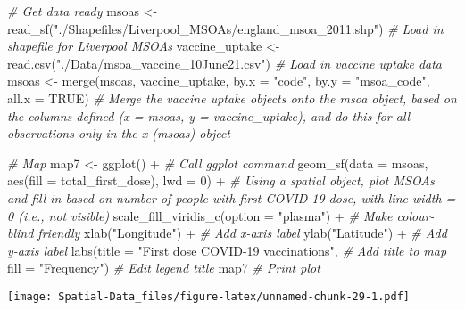 \documentclass[
]{book}
\newenvironment{Shaded}{\begin{snugshade}}{\end{snugshade}}
\newcommand{\AttributeTok}[1]{\textcolor[rgb]{0.77,0.63,0.00}{#1}}
\newcommand{\CommentTok}[1]{\textcolor[rgb]{0.56,0.35,0.01}{\textit{#1}}}
\newcommand{\ConstantTok}[1]{\textcolor[rgb]{0.00,0.00,0.00}{#1}}
\newcommand{\DecValTok}[1]{\textcolor[rgb]{0.00,0.00,0.81}{#1}}
\newcommand{\FunctionTok}[1]{\textcolor[rgb]{0.00,0.00,0.00}{#1}}
\newcommand{\NormalTok}[1]{#1}
\newcommand{\OtherTok}[1]{\textcolor[rgb]{0.56,0.35,0.01}{#1}}
\newcommand{\SpecialCharTok}[1]{\textcolor[rgb]{0.00,0.00,0.00}{#1}}
\newcommand{\StringTok}[1]{\textcolor[rgb]{0.31,0.60,0.02}{#1}}
\begin{document}
\begin{Shaded}
\begin{Highlighting}[]
\CommentTok{\# Get data ready}
\NormalTok{msoas }\OtherTok{\textless{}{-}} \FunctionTok{read\_sf}\NormalTok{(}\StringTok{"./Shapefiles/Liverpool\_MSOAs/england\_msoa\_2011.shp"}\NormalTok{)  }\CommentTok{\# Load in shapefile for Liverpool MSOAs}
\NormalTok{vaccine\_uptake }\OtherTok{\textless{}{-}} \FunctionTok{read.csv}\NormalTok{(}\StringTok{"./Data/msoa\_vaccine\_10June21.csv"}\NormalTok{) }\CommentTok{\# Load in vaccine uptake data}
\NormalTok{msoas }\OtherTok{\textless{}{-}} \FunctionTok{merge}\NormalTok{(msoas, vaccine\_uptake, }\AttributeTok{by.x =} \StringTok{"code"}\NormalTok{, }\AttributeTok{by.y =} \StringTok{"msoa\_code"}\NormalTok{, }\AttributeTok{all.x =} \ConstantTok{TRUE}\NormalTok{) }\CommentTok{\# Merge the vaccine uptake objects onto the msoa object, based on the columns defined (x = msoas, y = vaccine\_uptake), and do this for all observations only in the x (msoas) object}

\CommentTok{\# Map}
\NormalTok{map7 }\OtherTok{\textless{}{-}} \FunctionTok{ggplot}\NormalTok{() }\SpecialCharTok{+} \CommentTok{\# Call ggplot command}
            \FunctionTok{geom\_sf}\NormalTok{(}\AttributeTok{data =}\NormalTok{ msoas, }\FunctionTok{aes}\NormalTok{(}\AttributeTok{fill =}\NormalTok{ total\_first\_dose), }\AttributeTok{lwd =} \DecValTok{0}\NormalTok{) }\SpecialCharTok{+} \CommentTok{\# Using a spatial object, plot MSOAs and fill in based on number of people with first COVID{-}19 dose, with line width = 0 (i.e., not visible)}
            \FunctionTok{scale\_fill\_viridis\_c}\NormalTok{(}\AttributeTok{option =} \StringTok{"plasma"}\NormalTok{) }\SpecialCharTok{+} \CommentTok{\# Make colour{-}blind friendly}
            \FunctionTok{xlab}\NormalTok{(}\StringTok{"Longitude"}\NormalTok{) }\SpecialCharTok{+} \CommentTok{\# Add x{-}axis label}
            \FunctionTok{ylab}\NormalTok{(}\StringTok{"Latitude"}\NormalTok{) }\SpecialCharTok{+} \CommentTok{\# Add y{-}axis label}
            \FunctionTok{labs}\NormalTok{(}\AttributeTok{title =} \StringTok{"First dose COVID{-}19 vaccinations"}\NormalTok{, }\CommentTok{\# Add title to map}
                 \AttributeTok{fill =} \StringTok{"Frequency"}\NormalTok{) }\CommentTok{\# Edit legend title}
\NormalTok{map7 }\CommentTok{\# Print plot}
\end{Highlighting}
\end{Shaded}

\texttt{[image: Spatial-Data\_files/figure-latex/unnamed-chunk-29-1.pdf]}
\end{document}
